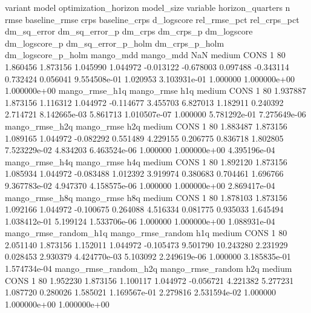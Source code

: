               variant             model optimization_horizon model_size variable  horizon_quarters  n      rmse  baseline_rmse     crps  baseline_crps  d_logscore  rel_rmse_pct  rel_crps_pct  dm_sq_error  dm_sq_error_p   dm_crps    dm_crps_p  dm_logscore  dm_logscore_p  dm_sq_error_p_holm  dm_crps_p_holm  dm_logscore_p_holm
            mango_mdd         mango_mdd                  NaN     medium     CONS                 1 80  1.860456       1.873156 1.045990       1.044972   -0.013122     -0.678003      0.097488    -0.343114       0.732424  0.056041 9.554508e-01     1.020953   3.103931e-01            1.000000    1.000000e+00        1.000000e+00
       mango_rmse_h1q        mango_rmse                  h1q     medium     CONS                 1 80  1.937887       1.873156 1.116312       1.044972   -0.114677      3.455703      6.827013     1.182911       0.240392  2.714721 8.142665e-03     5.861713   1.010507e-07            1.000000    5.781292e-01        7.275649e-06
       mango_rmse_h2q        mango_rmse                  h2q     medium     CONS                 1 80  1.883487       1.873156 1.089165       1.044972   -0.082292      0.551489      4.229155     0.206775       0.836718  1.802805 7.523229e-02     4.834203   6.463524e-06            1.000000    1.000000e+00        4.395196e-04
       mango_rmse_h4q        mango_rmse                  h4q     medium     CONS                 1 80  1.892120       1.873156 1.085934       1.044972   -0.083488      1.012392      3.919974     0.380683       0.704461  1.696766 9.367783e-02     4.947370   4.158575e-06            1.000000    1.000000e+00        2.869417e-04
       mango_rmse_h8q        mango_rmse                  h8q     medium     CONS                 1 80  1.878103       1.873156 1.092166       1.044972   -0.100675      0.264088      4.516334     0.081775       0.935033  1.645494 1.038412e-01     5.199124   1.533706e-06            1.000000    1.000000e+00        1.088931e-04
mango_rmse_random_h1q mango_rmse_random                  h1q     medium     CONS                 1 80  2.051140       1.873156 1.152011       1.044972   -0.105473      9.501790     10.243280     2.231929       0.028453  2.930379 4.424770e-03     5.103092   2.249619e-06            1.000000    3.185835e-01        1.574734e-04
mango_rmse_random_h2q mango_rmse_random                  h2q     medium     CONS                 1 80  1.952230       1.873156 1.100117       1.044972   -0.056721      4.221382      5.277231     1.087720       0.280026  1.585021 1.169567e-01     2.279816   2.531594e-02            1.000000    1.000000e+00        1.000000e+00

